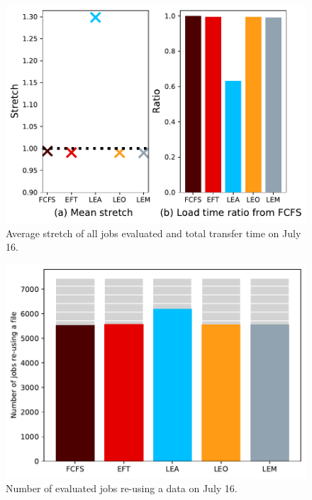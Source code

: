 \documentclass[conference,10pt]{IEEEtran}
\begin{document}
\begin{figure}[t]\centering\includegraphics[width=1\linewidth]{../MBSS/plot/Results_FCFS_Score_Backfill_2022-07-16->2022-07-16_V10000_Mean_Stretch_Total_waiting_for_a_load_time_and_transfer_time_450_128_32_256_4_1024.pdf}\caption{Average stretch of all jobs evaluated and total transfer time on July 16.}\label{stretch.07-16}\end{figure}
\begin{figure}[t]\centering\includegraphics[width=1\linewidth]{../MBSS/plot/Results_FCFS_Score_Backfill_2022-07-16->2022-07-16_V10000_Number_of_data_reuse_450_128_32_256_4_1024.pdf}\caption{Number of evaluated jobs re-using a data on July 16.}\label{reuse.07-16}\end{figure}
\end{document}
